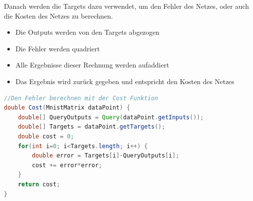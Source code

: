 \documentclass[12pt]{article}
\begin{document}
Danach werden die Targets dazu verwendet, um den Fehler des Netzes, oder auch die Kosten des Netzes zu berechnen. 
\begin{itemize}
\item Die Outputs werden von den Targets abgezogen
\item Die Fehler werden quadriert
\item Alle Ergebnisse dieser Rechnung werden aufaddiert
\item Das Ergebnis wird zurück gegeben und entspricht den Kosten des Netzes
\end{itemize}
\begin{lstlisting}[language=Java]
//Den Fehler berechnen mit der Cost Funktion
double Cost(MnistMatrix dataPoint) {
    double[] QueryOutputs = Query(dataPoint.getInputs());
    double[] Targets = dataPoint.getTargets();
    double cost = 0;
    for(int i=0; i<Targets.length; i++) {
        double error = Targets[i]-QueryOutputs[i];
        cost += error*error;
    }
    return cost;
}
\end{lstlisting}
\end{document}
